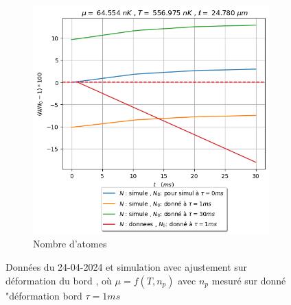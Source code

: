 \documentclass[a3, 10pt,twoside]{article}          %
\theoremstyle{plain}
\theoremstyle{definition}
\theoremstyle{remark}
\theoremstyle{definition} %
\begin{document}
\begin{figure}[ht]
    \hfill
    \begin{subfigure}[b]{0.3\textwidth}
        \centering
        \includegraphics[width=\textwidth]{Figures/Nat}
        \caption{Nombre d'atomes}
        \label{fig:sub3}
    \end{subfigure}
    


    \caption{Données du 24-04-2024 et simulation avec ajustement sur déformation du bord , où $\mu = f(T , n_p)$ avec $n_p$ mesuré sur donné "déformation bord $\tau = 1ms$}
    \label{fig:main}
\end{figure}
\end{document}
